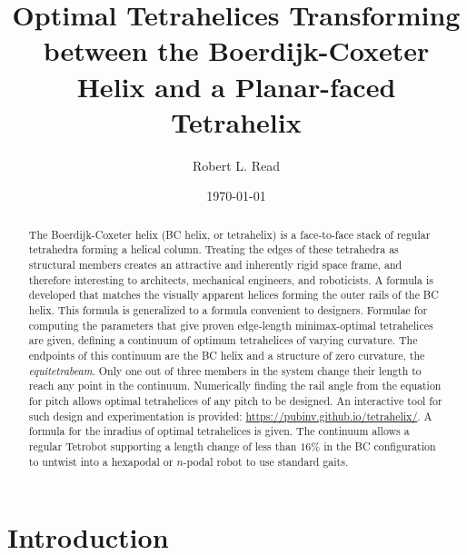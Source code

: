 \documentclass[twocolumn,10pt]{asme2ej}
\title{Optimal Tetrahelices Transforming between the Boerdijk-Coxeter Helix and a Planar-faced Tetrahelix}
\author{Robert L. Read
  \affiliation{
    Founder, Public Invention \\
    Austin, TX, 78704 \\
    Email: \href{mailto:read.robert@gmail.com}{read.robert@gmail.com} 
    }
}
\date{\today}
\begin{document}
\maketitle



\begin{abstract}
  The Boerdijk-Coxeter helix (BC helix, or tetrahelix) is a
  face-to-face stack of regular tetrahedra forming a helical column.  Treating the edges of
  these tetrahedra as structural members creates an attractive and
  inherently rigid space frame, and therefore interesting to architects,
  mechanical engineers, and roboticists.  A formula is developed that matches the
  visually apparent helices forming the outer rails of the BC helix.
  This formula is generalized to a formula convenient to designers.
  Formulae for 
  computing the
  parameters that give proven edge-length minimax-optimal tetrahelices
  are given, defining a continuum of optimum tetrahelices of varying curvature.
  The endpoints of this continuum are the BC helix and
  a structure of zero curvature, the \emph{equitetrabeam}.
  Only one out of three members in the system change their length to reach
  any point in the continuum.
  Numerically finding the rail angle from the equation for
  pitch allows optimal tetrahelices of any pitch to be designed. 
  An interactive tool for such design and experimentation is provided: \url{https://pubinv.github.io/tetrahelix/}.
  A formula for the inradius of optimal tetrahelices is given.
  The continuum allows a regular Tetrobot supporting a length change of less than $16\%$ in the
  BC configuration to untwist into a hexapodal or $n$-podal robot
  to use standard gaits.
\end{abstract}






\section{Introduction}
\end{document}
